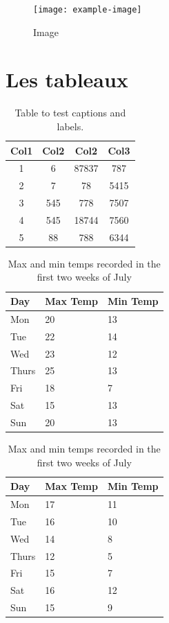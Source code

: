 \documentclass[a4paper,11pt]{report}    %
\begin{document}
\begin{figure}[H]
    \centering
    \texttt{[image: example-image]}
    \caption{Image}
    \label{fig:example-image}
\end{figure}

\section{Les tableaux}

\begin{table}[H]
\centering
\begin{tabular}{||c c c c||}
 \hline
 Col1 & Col2 & Col2 & Col3 \\ [0.5ex]
 \hline\hline
 1 & 6 & 87837 & 787 \\
 2 & 7 & 78 & 5415 \\
 3 & 545 & 778 & 7507 \\
 4 & 545 & 18744 & 7560 \\
 5 & 88 & 788 & 6344 \\ [1ex]
 \hline
\end{tabular}
\caption{Table to test captions and labels.}
\label{table:1}
\end{table}

\begin{table}[H]
    \begin{subtable}[h]{0.45\textwidth}
        \centering
        \begin{tabular}{l | l | l}
        Day & Max Temp & Min Temp \\
        \hline \hline
        Mon & 20 & 13\\
        Tue & 22 & 14\\
        Wed & 23 & 12\\
        Thurs & 25 & 13\\
        Fri & 18 & 7\\
        Sat & 15 & 13\\
        Sun & 20 & 13
       \end{tabular}
       \caption{First Week}
       \label{subtab:week1}
    \end{subtable}%
    \hfill
    \begin{subtable}[h]{0.45\textwidth}
        \centering
        \begin{tabular}{l | l | l}
        Day & Max Temp & Min Temp \\
        \hline \hline
        Mon & 17 & 11\\
        Tue & 16 & 10\\
        Wed & 14 & 8\\
        Thurs & 12 & 5\\
        Fri & 15 & 7\\
        Sat & 16 & 12\\
        Sun & 15 & 9
        \end{tabular}
        \caption{Second Week}
        \label{subtab:week2}
     \end{subtable}
     \caption{Max and min temps recorded in the first two weeks of July}
     \label{tab:temps}
\end{table}
\end{document}
